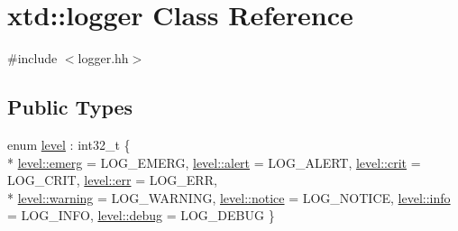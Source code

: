 \hypertarget{classxtd_1_1logger}{\section{xtd\-:\-:logger Class Reference}
\label{classxtd_1_1logger}
}


{\ttfamily \#include $<$logger.\-hh$>$}

\subsection*{Public Types}
\begin{DoxyCompactItemize}
\item 
enum \hyperlink{classxtd_1_1logger_a250ce2f143da181d7149a1556da2a6f1}{level} \-: int32\-\_\-t \{ \\*
\hyperlink{classxtd_1_1logger_a250ce2f143da181d7149a1556da2a6f1ae6cb8d153a4c27be572a177366bd7abc}{level\-::emerg} = L\-O\-G\-\_\-\-E\-M\-E\-R\-G, 
\hyperlink{classxtd_1_1logger_a250ce2f143da181d7149a1556da2a6f1a7ed21143076d0cca420653d4345baa2f}{level\-::alert} = L\-O\-G\-\_\-\-A\-L\-E\-R\-T, 
\hyperlink{classxtd_1_1logger_a250ce2f143da181d7149a1556da2a6f1a5888c6a8bb862595985926d16c7dcf13}{level\-::crit} = L\-O\-G\-\_\-\-C\-R\-I\-T, 
\hyperlink{classxtd_1_1logger_a250ce2f143da181d7149a1556da2a6f1a56bd7107802ebe56c6918992f0608ec6}{level\-::err} = L\-O\-G\-\_\-\-E\-R\-R, 
\\*
\hyperlink{classxtd_1_1logger_a250ce2f143da181d7149a1556da2a6f1a7b83d3f08fa392b79e3f553b585971cd}{level\-::warning} = L\-O\-G\-\_\-\-W\-A\-R\-N\-I\-N\-G, 
\hyperlink{classxtd_1_1logger_a250ce2f143da181d7149a1556da2a6f1aefd2af60c8501931cb9c736b5ad74f65}{level\-::notice} = L\-O\-G\-\_\-\-N\-O\-T\-I\-C\-E, 
\hyperlink{classxtd_1_1logger_a250ce2f143da181d7149a1556da2a6f1acaf9b6b99962bf5c2264824231d7a40c}{level\-::info} = L\-O\-G\-\_\-\-I\-N\-F\-O, 
\hyperlink{classxtd_1_1logger_a250ce2f143da181d7149a1556da2a6f1aad42f6697b035b7580e4fef93be20b4d}{level\-::debug} = L\-O\-G\-\_\-\-D\-E\-B\-U\-G
 \}
\end{DoxyCompactItemize}
